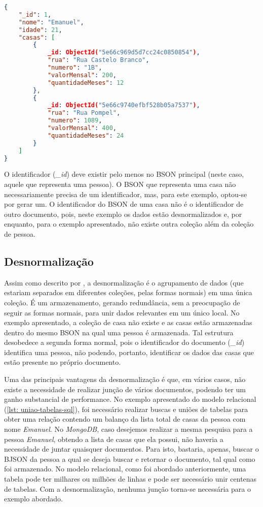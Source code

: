 \begin{lstlisting}[language=json, caption={BJSON da pessoa \textit{Emanuel}\label{lst: bjson-de-emanuel}}]
{
    "_id": 1,
    "nome": "Emanuel",
    "idade": 21,
    "casas": [
        {
            _id: ObjectId("5e66c969d5d7cc24c0850854"),
            "rua": "Rua Castelo Branco",
            "numero": "1B",
            "valorMensal": 200,
            "quantidadeMeses": 12
        },
        {
            _id: ObjectId("5e66c9740efbf528b05a7537"),
            "rua": "Rua Pompel",
            "numero": 1089,
            "valorMensal": 400,
            "quantidadeMeses": 24
        }
    ]
}
\end{lstlisting}

O identificador (\textit{\_id}) deve existir pelo menos no BSON principal (neste caso, aquele que representa uma pessoa). O BSON que representa uma casa não necessariamente precisa de um identificador, mas, para este exemplo, optou-se por gerar um. O identificador do BSON de uma casa não é o identificador de outro documento, pois, neste exemplo os dados estão desnormalizados e, por enquanto, para o exemplo apresentado, não existe outra coleção além da coleção de pessoa.

\subsection{Desnormalização}

Assim como descrito por , a desnormalização é o agrupamento de dados (que estariam separados em diferentes coleções, pelas formas normais) em uma única coleção. É um armazenamento, gerando redundância, sem a preocupação de seguir as formas normais, para unir dados relevantes em um único local. No exemplo apresentado, a coleção de casa não existe e as casas estão armazenadas dentro do mesmo BSON na qual uma pessoa é armazenada. Tal estrutura desobedece a segunda forma normal, pois o identificador do documento (\textit{\_id}) identifica uma pessoa, não podendo, portanto, identificar os dados das casas que estão presente no próprio documento.
    
Uma das principais vantagens da desnormalização é que, em vários casos, não existe a necessidade de realizar junção de vários documentos, podendo ter um ganho substancial de performance. No exemplo apresentado do modelo relacional (\ref{lst: uniao-tabelas-sql}), foi necessário realizar buscas e uniões de tabelas para obter uma relação contendo um balanço da lista total de casas da pessoa com nome \textit{Emanuel}. No \textit{MongoDB}, caso desejemos realizar a mesma pesquisa para a pessoa \textit{Emanuel}, obtendo a lista de casas que ela possui, não haveria a necessidade de juntar quaisquer documentos. Para isto, bastaria, apenas, buscar o BJSON da pessoa a qual se deseja buscar e retornar o documento, tal qual como foi armazenado. No modelo relacional, como foi abordado anteriormente, uma tabela pode ter milhares ou milhões de linhas e pode ser necessário unir centenas de tabelas. Com a desnormalização, nenhuma junção torna-se necessária para o exemplo abordado.

